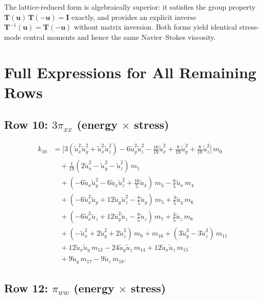 \documentclass[11pt,a4paper]{article}
\newcommand{\vect}[1]{\bm{#1}}
\newcommand{\mat}[1]{\bm{#1}}
\newcommand{\Tmat}{\mat{T}}
\newcommand{\Imat}{\mat{I}}
\newcommand{\tu}{\tilde{u}}
\begin{document}
The lattice-reduced form is algebraically superior: it satisfies the group property $\Tmat(\vect{u})\,\Tmat(-\vect{u}) = \Imat$ exactly, and provides an explicit inverse $\Tmat^{-1}(\vect{u}) = \Tmat(-\vect{u})$ without matrix inversion.
Both forms yield identical stress-mode central moments and hence the same Navier--Stokes viscosity.

\appendix
\section{Full Expressions for All Remaining Rows}\label{app:full}

\subsection{Row 10: $3\pi_{xx}$ (energy $\times$ stress)}

\begin{align}
  k_{10} &= \bigl[3(\tu_x^2\tu_y^2 + \tu_x^2\tu_z^2) - 6\tu_y^2\tu_z^2 - \tfrac{16}{19}\tu_x^2 + \tfrac{8}{19}\tu_y^2 + \tfrac{8}{19}\tu_z^2\bigr]\,m_0 \nonumber\\
  &\quad + \tfrac{1}{19}(2\tu_x^2 - \tu_y^2 - \tu_z^2)\,m_1 \nonumber\\
  &\quad + (-6\tu_x\tu_y^2 - 6\tu_x\tu_z^2 + \tfrac{16}{5}\tu_x)\,m_3 - \tfrac{6}{5}\tu_x\,m_4 \nonumber\\
  &\quad + (-6\tu_x^2\tu_y + 12\tu_y\tu_z^2 - \tfrac{8}{5}\tu_y)\,m_5 + \tfrac{3}{5}\tu_y\,m_6 \nonumber\\
  &\quad + (-6\tu_x^2\tu_z + 12\tu_y^2\tu_z - \tfrac{8}{5}\tu_z)\,m_7 + \tfrac{3}{5}\tu_z\,m_8 \nonumber\\
  &\quad + (-\tu_x^2 + 2\tu_y^2 + 2\tu_z^2)\,m_9 + m_{10} + (3\tu_y^2 - 3\tu_z^2)\,m_{11} \nonumber\\
  &\quad + 12\tu_x\tu_y\,m_{13} - 24\tu_y\tu_z\,m_{14} + 12\tu_x\tu_z\,m_{15} \nonumber\\
  &\quad + 9\tu_y\,m_{17} - 9\tu_z\,m_{18}. \label{eq:k10}
\end{align}

\subsection{Row 12: $\pi_{ww}$ (energy $\times$ stress)}
\end{document}
